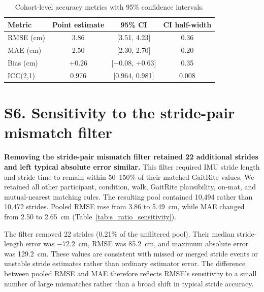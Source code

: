 \documentclass[fleqn,10pt,lineno]{wlpeerj}
\begin{document}
\begin{table}[!ht]
\centering
\caption{Cohort-level accuracy metrics with 95\% confidence intervals.}
\label{tab:s_robustness}
\small
\begin{tabular}{@{}lccc@{}}
\toprule
Metric & Point estimate & 95\% CI & CI half-width \\
\midrule
RMSE (cm)              & 3.86  & [3.51, 4.23]   & 0.36 \\
MAE (cm)               & 2.50  & [2.30, 2.70]   & 0.20 \\
Bias (cm)              & $+0.26$ & [$-0.08$, $+0.63$] & 0.35 \\
ICC(2,1)               & 0.976 & [0.964, 0.981] & 0.008 \\
\bottomrule
\end{tabular}
\end{table}


\newpage
{}
\section*{S6. Sensitivity to the stride-pair mismatch filter}

\textbf{Removing the stride-pair mismatch filter retained 22 additional strides and left typical absolute error similar.} This filter required IMU stride length and stride time to remain within 50--150\% of their matched GaitRite values. We retained all other participant, condition, walk, GaitRite plausibility, on-mat, and mutual-nearest matching rules. The resulting pool contained 10{,}494 rather than 10{,}472 strides. Pooled RMSE rose from 3.86 to 5.49~cm, while MAE changed from 2.50 to 2.65~cm (Table~\ref{tab:s_ratio_sensitivity}).

The filter removed 22 strides (0.21\% of the unfiltered pool). Their median stride-length error was $-72.2$~cm, RMSE was 85.2~cm, and maximum absolute error was 129.2~cm. These values are consistent with missed or merged stride events or unstable stride estimates rather than ordinary estimator error. The difference between pooled RMSE and MAE therefore reflects RMSE's sensitivity to a small number of large mismatches rather than a broad shift in typical stride accuracy.
\end{document}
